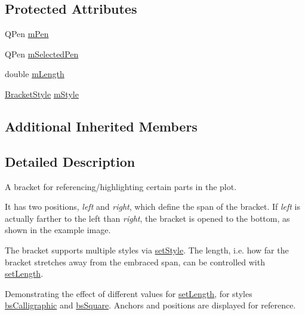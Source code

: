\subsection*{Protected Attributes}
\begin{DoxyCompactItemize}
\item 
Q\+Pen \mbox{\hyperlink{class_q_c_p_item_bracket_a350c864a5853b04343719f5a8be6b675}{m\+Pen}}
\item 
Q\+Pen \mbox{\hyperlink{class_q_c_p_item_bracket_adcfb53602d1802d00e2de4fd6df6b291}{m\+Selected\+Pen}}
\item 
double \mbox{\hyperlink{class_q_c_p_item_bracket_ab3d99bba8da18eb4d0e0cb23dded33b2}{m\+Length}}
\item 
\mbox{\hyperlink{class_q_c_p_item_bracket_a7ac3afd0b24a607054e7212047d59dbd}{Bracket\+Style}} \mbox{\hyperlink{class_q_c_p_item_bracket_ac911907184c824d621f274f8e0990080}{m\+Style}}
\end{DoxyCompactItemize}
\subsection*{Additional Inherited Members}


\subsection{Detailed Description}
A bracket for referencing/highlighting certain parts in the plot. 

 It has two positions, {\itshape left} and {\itshape right}, which define the span of the bracket. If {\itshape left} is actually farther to the left than {\itshape right}, the bracket is opened to the bottom, as shown in the example image.

The bracket supports multiple styles via \mbox{\hyperlink{class_q_c_p_item_bracket_a612dffa2373422eef8754d690add3703}{set\+Style}}. The length, i.\+e. how far the bracket stretches away from the embraced span, can be controlled with \mbox{\hyperlink{class_q_c_p_item_bracket_ac7cfc3da7da9b5c5ac5dfbe4f0351b2a}{set\+Length}}.

 \begin{center}Demonstrating the effect of different values for \mbox{\hyperlink{class_q_c_p_item_bracket_ac7cfc3da7da9b5c5ac5dfbe4f0351b2a}{set\+Length}}, for styles \mbox{\hyperlink{class_q_c_p_item_bracket_a7ac3afd0b24a607054e7212047d59dbda8f29f5ef754e2dc9a9efdedb2face0f3}{bs\+Calligraphic}} and \mbox{\hyperlink{class_q_c_p_item_bracket_a7ac3afd0b24a607054e7212047d59dbda7f9df4a7359bfe3dac1dbe4ccf5d220c}{bs\+Square}}. Anchors and positions are displayed for reference.\end{center} 


